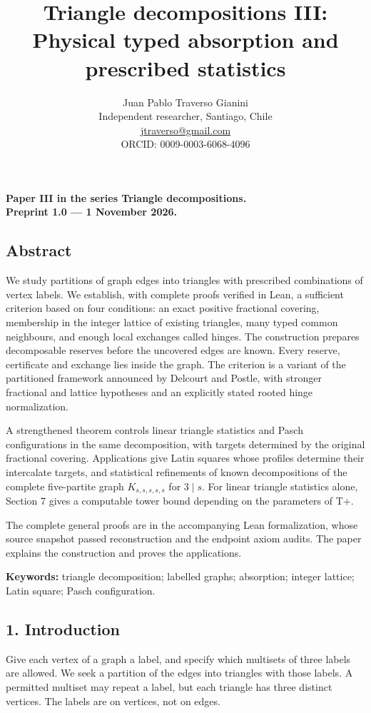 \documentclass[english,11pt,a4paper]{article}
\title{Triangle decompositions III: Physical typed absorption and prescribed statistics}
\author{Juan Pablo Traverso Gianini\\
\small Independent researcher, Santiago, Chile\\
\small \href{mailto:jtraverso@gmail.com}{jtraverso@gmail.com}\\
\small ORCID: 0009-0003-6068-4096}
\date{}
\begin{document}
\raggedbottom\maketitle
\textbf{Paper III in the series Triangle decompositions.}\\
\textbf{Preprint 1.0 --- 1 November 2026.}

\subsection{Abstract}\label{abstract}

We study partitions of graph edges into triangles with prescribed combinations of vertex labels. We establish, with complete proofs verified in Lean, a sufficient criterion based on four conditions: an exact positive fractional covering, membership in the integer lattice of existing triangles, many typed common neighbours, and enough local exchanges called hinges. The construction prepares decomposable reserves before the uncovered edges are known. Every reserve, certificate and exchange lies inside the graph. The criterion is a variant of the partitioned framework announced by Delcourt and Postle, with stronger fractional and lattice hypotheses and an explicitly stated rooted hinge normalization.

A strengthened theorem controls linear triangle statistics and Pasch configurations in the same decomposition, with targets determined by the original fractional covering. Applications give Latin squares whose profiles determine their intercalate targets, and statistical refinements of known decompositions of the complete five-partite graph \(K_{s,s,s,s,s}\) for \(3\mid s\). For linear triangle statistics alone, Section 7 gives a computable tower bound depending on the parameters of T+.

The complete general proofs are in the accompanying Lean formalization, whose source snapshot passed reconstruction and the endpoint axiom audits. The paper explains the construction and proves the applications.

\textbf{Keywords:} triangle decomposition; labelled graphs; absorption; integer lattice; Latin square; Pasch configuration.

\subsection{1. Introduction}\label{introduction}

Give each vertex of a graph a label, and specify which multisets of three labels are allowed. We seek a partition of the edges into triangles with those labels. A permitted multiset may repeat a label, but each triangle has three distinct vertices. The labels are on vertices, not on edges.
\end{document}
